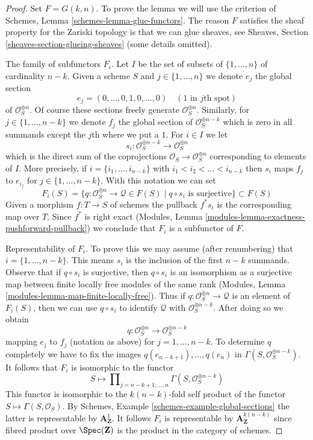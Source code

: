 \begin{proof}
Set $F = G(k, n)$. To prove the lemma we will use the criterion of
Schemes, Lemma \ref{schemes-lemma-glue-functors}.
The reason $F$ satisfies the sheaf property for the
Zariski topology is that we can glue sheaves, see Sheaves,
Section \ref{sheaves-section-glueing-sheaves} (some details omitted).

\medskip\noindent
The family of subfunctors $F_i$.
Let $I$ be the set of subsets of $\{1, \ldots, n\}$ of cardinality $n - k$.
Given a scheme $S$ and $j \in \{1, \ldots, n\}$ we denote $e_j$
the global section
$$
e_j = (0, \ldots, 0, 1, 0, \ldots, 0)\quad(1\text{ in }j\text{th spot})
$$
of $\mathcal{O}_S^{\oplus n}$. Of course these sections freely generate
$\mathcal{O}_S^{\oplus n}$. Similarly, for $j \in \{1, \ldots, n - k\}$
we denote $f_j$ the global section of $\mathcal{O}_S^{\oplus n - k}$
which is zero in all summands except the $j$th where we put a $1$.
For $i \in I$ we let
$$
s_i : \mathcal{O}_S^{\oplus n - k} \longrightarrow \mathcal{O}_S^{\oplus n}
$$
which is the direct sum of the coprojections
$\mathcal{O}_S \to \mathcal{O}_S^{\oplus n}$ corresponding to elements of $I$.
More precisely, if $i = \{i_1, \ldots, i_{n - k}\}$ with
$i_1 < i_2 < \ldots < i_{n - k}$
then $s_i$ maps $f_j$ to $e_{i_j}$ for $j \in \{1, \ldots, n - k\}$.
With this notation we can set
$$
F_i(S) = \{q : \mathcal{O}_S^{\oplus n} \to \mathcal{Q} \in F(S) \mid
q \circ s_i \text{ is surjective}\}
\subset F(S)
$$
Given a morphism $f : T \to S$ of schemes the pullback $f^*s_i$
is the corresponding map over $T$. Since $f^*$ is right exact
(Modules, Lemma \ref{modules-lemma-exactness-pushforward-pullback})
we conclude that $F_i$ is a subfunctor of $F$.

\medskip\noindent
Representability of $F_i$. To prove this we may assume (after renumbering)
that $i = \{1, \ldots, n - k\}$. This means $s_i$ is the inclusion of
the first $n - k$ summands. Observe that if $q \circ s_i$ is surjective,
then $q \circ s_i$ is an isomorphism as a surjective map between finite
locally free modules of the same rank
(Modules, Lemma \ref{modules-lemma-map-finite-locally-free}).
Thus if $q : \mathcal{O}_S^{\oplus n} \to \mathcal{Q}$ is an element of
$F_i(S)$, then we can use $q \circ s_i$ to identify $\mathcal{Q}$ with
$\mathcal{O}_S^{\oplus n - k}$. After doing so we obtain
$$
q : \mathcal{O}_S^{\oplus n} \longrightarrow \mathcal{O}_S^{\oplus n - k}
$$
mapping $e_j$ to $f_j$ (notation as above) for $j = 1, \ldots, n - k$.
To determine $q$ completely we have to fix the images
$q(e_{n - k + 1}), \ldots, q(e_n)$ in
$\Gamma(S, \mathcal{O}_S^{\oplus n - k})$.
It follows that $F_i$ is isomorphic to the functor
$$
S \longmapsto
\prod\nolimits_{j = n - k + 1, \ldots, n}
\Gamma(S,  \mathcal{O}_S^{\oplus n - k})
$$
This functor is isomorphic to the $k(n - k)$-fold self product of the functor
$S \mapsto \Gamma(S, \mathcal{O}_S)$. By
Schemes, Example \ref{schemes-example-global-sections}
the latter is representable by $\mathbf{A}^1_\mathbf{Z}$. It follows $F_i$
is representable by $\mathbf{A}^{k(n - k)}_\mathbf{Z}$ since fibred product
over $\Spec(\mathbf{Z})$ is the product in the category of schemes.


\end{proof}
